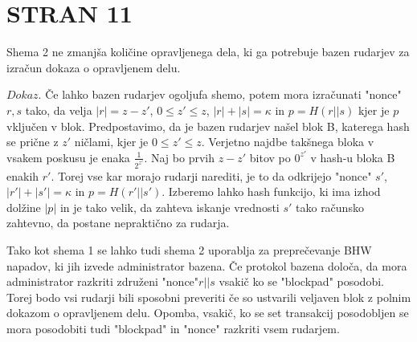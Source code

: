 \documentclass{acm_proc_article-sp}
\begin{document}
\section{STRAN 11}

\begin{lema}\label{lema6}
	Shema 2 ne zmanjša količine opravljenega dela, ki ga potrebuje bazen rudarjev za izračun dokaza o opravljenem delu.
\end{lema}

\noindent\textit{$Dokaz$}. Če lahko bazen rudarjev ogoljufa shemo, potem mora izračunati "nonce"\textit{$r,s$} tako, da velja \textit{$|r| = z - z'$}, \textit{$0 \leq z' \leq z$}, \textit{$|r| + |s| = \kappa$} in \textit{$p = H(r||s)$} kjer je \textit{$p$} vključen v blok. Predpostavimo, da je bazen rudarjev našel blok B, katerega hash se prične z \textit{$z'$} ničlami, kjer je \textit{$0 \leq z' \leq z$}. Verjetno najdbe takšnega bloka v vsakem poskusu je enaka $\frac{1}{2^{z'}}$. Naj bo prvih \textit{$z - z'$} bitov po \textit{$0^{z'}$} v hash-u bloka B enakih \textit{$r'$}. Torej vse kar morajo rudarji narediti, je to da odkrijejo "nonce" \textit{$s'$}, \textit{$|r'| + |s'| = \kappa$} in \textit{$p = H(r'||s')$}. Izberemo lahko hash funkcijo, ki ima izhod dolžine \textit{$|p|$} in je tako velik, da zahteva iskanje vrednosti \textit{$s'$} tako računsko zahtevno, da postane nepraktično za rudarja.

Tako kot shema 1 se lahko tudi shema 2 uporablja za preprečevanje BHW napadov, ki jih izvede administrator bazena. Če protokol bazena določa, da mora administrator razkriti združeni "nonce"\textit{$r||s$} vsakič ko se "blockpad" posodobi. Torej bodo vsi rudarji bili sposobni preveriti če so ustvarili veljaven blok z polnim dokazom o opravljenem delu. Opomba, vsakič, ko se set transakcij posodobljen se mora posodobiti tudi "blockpad" in "nonce" razkriti vsem rudarjem.
\end{document}
